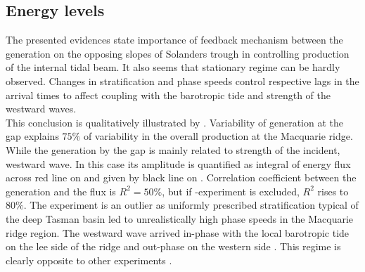 \documentclass[12pt]{article}
\begin{document}
\subsection{Energy levels}
The presented evidences state importance of feedback mechanism between the generation on the 
opposing slopes of Solanders trough in controlling production of the internal tidal beam. It 
also seems that stationary regime can be hardly observed. Changes in stratification and phase 
speeds control respective lags in the arrival times to affect coupling with the barotropic tide and 
strength of the westward waves.\\

This conclusion is qualitatively illustrated by . Variability of 
generation at the gap explains $75\%$ of variability in the overall production at the Macquarie 
ridge. While the generation by the gap is mainly related to strength of the incident, westward 
wave. In this case its amplitude is quantified as integral of energy flux across red line on 
 and given by black line on . 
Correlation 
coefficient between the generation and the flux is $R^2 = 50\%$, but if -experiment is 
excluded, $R^2$ rises to $80\%$. The  experiment is an outlier as uniformly prescribed 
stratification typical of the deep Tasman basin led to unrealistically high phase speeds in the 
Macquarie ridge region. The westward wave arrived in-phase with the local barotropic tide on the 
lee side of the ridge and out-phase on the western side . This regime is 
clearly opposite to other experiments .\\
\end{document}
